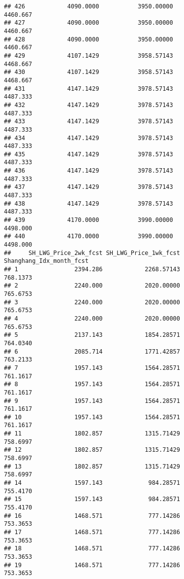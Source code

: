 \documentclass[]{article}
\begin{document}
\begin{verbatim}
## 426            4090.0000           3950.00000                4460.667
## 427            4090.0000           3950.00000                4460.667
## 428            4090.0000           3950.00000                4460.667
## 429            4107.1429           3958.57143                4468.667
## 430            4107.1429           3958.57143                4468.667
## 431            4147.1429           3978.57143                4487.333
## 432            4147.1429           3978.57143                4487.333
## 433            4147.1429           3978.57143                4487.333
## 434            4147.1429           3978.57143                4487.333
## 435            4147.1429           3978.57143                4487.333
## 436            4147.1429           3978.57143                4487.333
## 437            4147.1429           3978.57143                4487.333
## 438            4147.1429           3978.57143                4487.333
## 439            4170.0000           3990.00000                4498.000
## 440            4170.0000           3990.00000                4498.000
##     SH_LWG_Price_2wk_fcst SH_LWG_Price_1wk_fcst Shanghang_Idx_month_fcst
## 1                2394.286            2268.57143                 768.1373
## 2                2240.000            2020.00000                 765.6753
## 3                2240.000            2020.00000                 765.6753
## 4                2240.000            2020.00000                 765.6753
## 5                2137.143            1854.28571                 764.0340
## 6                2085.714            1771.42857                 763.2133
## 7                1957.143            1564.28571                 761.1617
## 8                1957.143            1564.28571                 761.1617
## 9                1957.143            1564.28571                 761.1617
## 10               1957.143            1564.28571                 761.1617
## 11               1802.857            1315.71429                 758.6997
## 12               1802.857            1315.71429                 758.6997
## 13               1802.857            1315.71429                 758.6997
## 14               1597.143             984.28571                 755.4170
## 15               1597.143             984.28571                 755.4170
## 16               1468.571             777.14286                 753.3653
## 17               1468.571             777.14286                 753.3653
## 18               1468.571             777.14286                 753.3653
## 19               1468.571             777.14286                 753.3653

\end{verbatim}
\end{document}

